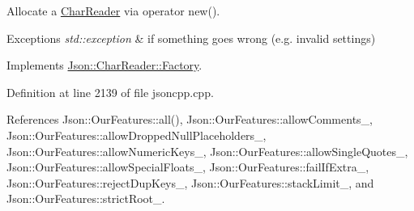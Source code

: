 Allocate a \hyperlink{class_json_1_1_char_reader}{Char\+Reader} via operator new(). 


\begin{DoxyExceptions}{Exceptions}
{\em std\+::exception} & if something goes wrong (e.\+g. invalid settings) \\
\hline
\end{DoxyExceptions}


Implements \hyperlink{class_json_1_1_char_reader_1_1_factory_a4c5862a1ffd432372dbe65cf59de98c4}{Json\+::\+Char\+Reader\+::\+Factory}.



Definition at line 2139 of file jsoncpp.\+cpp.



References Json\+::\+Our\+Features\+::all(), Json\+::\+Our\+Features\+::allow\+Comments\+\_\+, Json\+::\+Our\+Features\+::allow\+Dropped\+Null\+Placeholders\+\_\+, Json\+::\+Our\+Features\+::allow\+Numeric\+Keys\+\_\+, Json\+::\+Our\+Features\+::allow\+Single\+Quotes\+\_\+, Json\+::\+Our\+Features\+::allow\+Special\+Floats\+\_\+, Json\+::\+Our\+Features\+::fail\+If\+Extra\+\_\+, Json\+::\+Our\+Features\+::reject\+Dup\+Keys\+\_\+, Json\+::\+Our\+Features\+::stack\+Limit\+\_\+, and Json\+::\+Our\+Features\+::strict\+Root\+\_\+.


